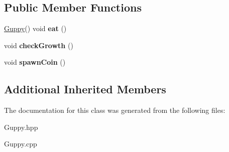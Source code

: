\subsection*{Public Member Functions}
\begin{DoxyCompactItemize}
\item 
\mbox{\label{classGuppy_afe934262a0988e4ad041f4ed3a1a7e02}} 
\hyperlink{classGuppy}{Guppy}() void {\bfseries eat} ()
\item 
\mbox{\label{classGuppy_a06ceefb07ac8f6d590f8343c93c1edd9}} 
void {\bfseries check\+Growth} ()
\item 
\mbox{\label{classGuppy_a58d97b8704a2635e7b7a1b365c37c570}} 
void {\bfseries spawn\+Coin} ()
\end{DoxyCompactItemize}
\subsection*{Additional Inherited Members}


The documentation for this class was generated from the following files\+:\begin{DoxyCompactItemize}
\item 
Guppy.\+hpp\item 
Guppy.\+cpp\end{DoxyCompactItemize}
